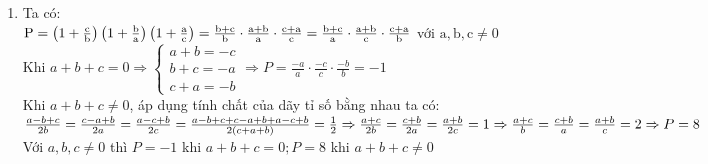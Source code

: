 \begin{bt}
{\begin{enumerate}[1.]
\begin{enumerate}[a.]
              $B=\frac{1}{-7^2 \cdot 11^2} \cdot 7^4 \cdot 11^2 \cdot 7^5 \cdot 11^5 \cdot \frac{1}{7^4} \cdot \frac{1}{7^3 \cdot 11^6} \\[5px]
              B=-\frac{7^9 \cdot 11^7}{7^9 \cdot 11^8} \\[5px]
              B=-\frac{1}{11}$\\[5px]
              Vậy $B=-\frac{1}{11}$.
            \end{enumerate}
        \item Ta có: \\[5px] 
        $\mathrm{P}=\left(1+\frac{\mathrm{c}}{\mathrm{b}}\right)\left(1+\frac{\mathrm{b}}{\mathrm{a}}\right)\left(1+\frac{\mathrm{a}}{\mathrm{c}}\right)=\frac{\mathrm{b}+\mathrm{c}}{\mathrm{b}} \cdot \frac{\mathrm{a}+\mathrm{b}}{\mathrm{a}} \cdot \frac{\mathrm{c}+\mathrm{a}}{\mathrm{c}}\\[5px] 
        =\frac{\mathrm{b}+\mathrm{c}}{\mathrm{a}} \cdot \frac{\mathrm{a}+\mathrm{b}}{\mathrm{c}} \cdot \frac{\mathrm{c}+\mathrm{a}}{\mathrm{b}}$ với $\mathrm{a}, \mathrm{b}, \mathrm{c} \neq 0$\\[5px] 
        Khi $a+b+c=0 \Rightarrow\left\{\begin{array}{l}a+b=-c \\[5px] b+c=-a \\[5px] c+a=-b\end{array} \Rightarrow P=\frac{-a}{a} \cdot \frac{-c}{c} \cdot \frac{-b}{b}=-1\right.$\\[5px]
        Khi $a+b+c \neq 0$, áp dụng tính chất của dãy tỉ số bằng nhau ta có:\\[5px]
        $\frac{a-b+c}{2 b}=\frac{c-a+b}{2 a}=\frac{a-c+b}{2 c}=\frac{a-b+c+c-a+b+a-c+b}{2(c+a+b)}=\frac{1}{2} \\[5px]
        \Rightarrow \frac{a+c}{2 b}=\frac{c+b}{2 a}=\frac{a+b}{2 c}=1 \Rightarrow \frac{a+c}{b}=\frac{c+b}{a}=\frac{a+b}{c}=2 \\[5px]
        \Rightarrow P=8$\\[5px]
        Với $a, b, c \neq 0$ thì $P=-1$ khi $a+b+c=0 ; P=8$ khi $a+b+c \neq 0$
    \end{enumerate}
    
}
\end{bt}


